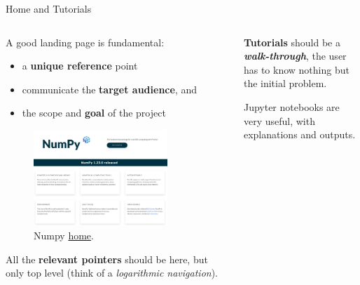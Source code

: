 \documentclass[9pt]{beamer}
\begin{document}
\begin{frame}{Home and Tutorials}
    \begin{columns}
        \begin{column}{0.5\textwidth}
            \vspace*{5pt}

            A good landing page is fundamental:
            \begin{itemize}
                \item a \textbf{unique reference} point
                \item communicate the \textbf{target audience}, and
                \item the scope and \textbf{goal} of the project
            \end{itemize}

            \begin{figure}
                \centering
                \includegraphics[width=0.8\textwidth]{numpy-home}
                \caption{Numpy \href{https://numpy.org/}{home}.}
            \end{figure}
            
            All the \textbf{relevant pointers} should be here, but only top
            level (think of a \textit{logarithmic navigation}).
        \end{column}
        \begin{column}{0.5\textwidth}
            \vspace*{10pt}

            \textbf{Tutorials} should be a \textit{\textbf{walk-through}}, the
            user has to know nothing but the initial problem.
            \vspace*{5pt}

            Jupyter notebooks are very useful, with explanations and outputs.
            \vspace*{5pt}


\end{column}
\end{columns}
\end{frame}
\end{document}
